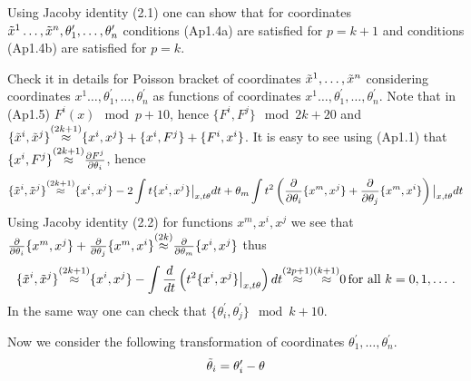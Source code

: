  Using Jacoby identity (2.1) one can show that for coordinates
  ${\tilde x^1\dots,\tilde x^n,\theta^\prime_1,\dots,\theta_n^\prime}$
  conditions  (Ap1.4a) are satisfied for $p=k+1$
  and conditions (Ap1.4b) are satisfied for $p=k$.

   Check it in details for Poisson bracket of coordinates
   ${\tilde x^1,\dots,\tilde x^n}$
  considering coordinates ${x^1\dots,\theta^\prime_1,\dots,\theta_n^\prime}$
  as functions of coordinates ${x^1\dots,\theta^\prime_1,\dots,\theta_n^\prime}$.
    Note that in  (Ap1.5) $F^i(x)\mod {p+1} 0$, hence
     $\{F^i,F^j\}\mod {2k+2} 0$ and
  $\{\t x^i,\t x^j\}\mod {2k+1} \{x^i,x^j\}+\{x^i,F^j\}+\{F^i,x^i\}$.
  It is easy to see using (Ap1.1) that
  $\{x^i,F^j\}\mod {2k+1} {\p F^j\over\p\theta_i}$, hence
                    $$
  \{\t x^i,\t x^j\}\mod {2k+1} \{x^i,x^j\}-
  2\int t\{x^i,x^j\}\big\vert_{x,t\theta}dt+
  \theta_m\int t^2
  \left(
  {\p\over\p\theta_i}\{x^m,x^j\}+
  {\p\over\p\theta_j}\{x^m,x^i\}\right)\big\vert_{x,t\theta}dt
                   $$
  Using Jacoby identity (2.2) for functions $x^m,x^i,x^j$
  we see that ${\p\over\p\theta_i}\{x^m,x^j\}+
        {\p\over\p\theta_j}\{x^m,x^i\}\mod {2k} {\p\over\p\theta_m}\{x^i,x^j\}$
        thus
                $$
\{\t x^i,\t x^j\}\mod {2k+1} \{x^i,x^j\}-
  \int {d\over dt}\left(t^2\{x^i,x^j\}\big\vert_{x,t\theta}\right)dt\mod {2p+1}
                 \mod {k+1} 0\,\hbox {for all}\,\, k=0,1,\dots\,.
              $$
 In the same way one can check that
 $\{\theta^\prime_i,\theta^\prime_j\}\mod {k+1} 0$.

 Now we consider the following transformation of coordinates
 $\theta^\prime_1,\dots,\theta_n^\prime$.
                $$
    \tilde\theta_i=\theta_i^\prime-\theta
                 $$


